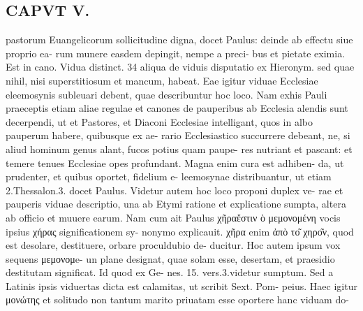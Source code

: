\documentclass{article}
\begin{document}
\begin{pages}
\section*{CAPVT  V. }
\marginpar{[ p.257 ]}pastorum Euangelicorum sollicitudine digna, docet Paulus: deinde ab effectu siue proprio ea- rum munere easdem depingit, nempe a preci- bus et pietate eximia. Est in cano. Vidua distinct. 34 aliqua de viduis disputatio ex Hieronym. sed quae nihil, nisi superstitiosum et mancum, habeat. Eae igitur viduae Ecclesiae eleemosynis subleuari debent, quae describuntur hoc loco. Nam exhis Pauli praeceptis etiam aliae regulae et canones de pauperibus ab Ecclesia alendis sunt decerpendi, ut et Pastores, et Diaconi Ecclesiae intelligant, quos in albo pauperum habere, quibusque ex ae- rario Ecclesiastico succurrere debeant, ne, si aliud hominum genus alant, fucos potius quam paupe- res nutriant et pascant: et temere tenues Ecclesiae opes profundant. Magna enim cura est adhiben- da, ut prudenter, et quibus oportet, fidelium e- leemosynae distribuantur, ut etiam 2.Thessalon.3. docet Paulus. Videtur autem hoc loco proponi duplex ve- rae et pauperis viduae descriptio, una ab Etymi ratione et explicatione sumpta, altera ab officio et muuere earum. Nam cum ait Paulus χῆραἔστιν ὸ μεμονομένη vocis ipsius χήρας significationem sy- nonymo explicauit. χῆρα enim ἀπὸ το͂ χηρο͂ν, quod est desolare, destituere, orbare proculdubio de- ducitur. Hoc autem ipsum vox sequens μεμονομe- un plane designat, quae solam esse, desertam, et praesidio destitutam significat. Id quod ex Ge- nes. 15. vers.3.videtur sumptum. Sed a Latinis ipsis viduertas dicta est calamitas, ut scribit Sext. Pom- peius. Haec igitur μονώτης et solitudo non tantum marito priuatam esse oportere hanc viduam do- 

\end{pages}
\end{document}
